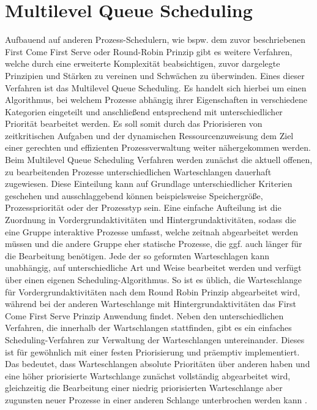 
\section{Multilevel Queue Scheduling}
Aufbauend auf anderen Prozess-Schedulern, wie bspw. dem zuvor beschriebenen First Come First Serve oder Round-Robin Prinzip gibt es weitere Verfahren, welche durch eine erweiterte Komplexität beabsichtigen, zuvor dargelegte Prinzipien und Stärken zu vereinen und Schwächen zu überwinden. Eines dieser Verfahren ist das Multilevel Queue Scheduling. Es handelt sich hierbei um einen Algorithmus, bei welchem Prozesse abhängig ihrer Eigenschaften in verschiedene Kategorien eingeteilt und anschließend entsprechend mit unterschiedlicher Priorität bearbeitet werden. Es soll somit durch das Priorisieren von zeitkritischen Aufgaben und der dynamischen Ressourcenzuweisung dem Ziel einer gerechten und effizienten Prozessverwaltung weiter nähergekommen werden.
Beim Multilevel Queue Scheduling Verfahren werden zunächst die aktuell offenen, zu bearbeitenden Prozesse unterschiedlichen Warteschlangen dauerhaft zugewiesen. Diese Einteilung kann auf Grundlage unterschiedlicher Kriterien geschehen und ausschlaggebend können beispielsweise Speichergröße, Prozesspriorität oder der Prozesstyp sein. Eine einfache Aufteilung ist die Zuordnung in Vordergrundaktivitäten und Hintergrundaktivitäten, sodass die eine Gruppe interaktive Prozesse umfasst, welche zeitnah abgearbeitet werden müssen und die andere Gruppe eher statische Prozesse, die ggf. auch länger für die Bearbeitung benötigen. Jede der so geformten Warteschlagen kann unabhängig, auf unterschiedliche Art und Weise bearbeitet werden und verfügt über einen eigenen Scheduling-Algorithmus. So ist es üblich, die Warteschlange für Vordergrundaktivitäten nach dem Round Robin Prinzip abgearbeitet wird, während bei der anderen Warteschlange mit Hintergrundaktivitäten das First Come First Serve Prinzip Anwendung findet. %
Neben den unterschiedlichen Verfahren, die innerhalb der Wartschlangen stattfinden, gibt es ein einfaches Scheduling-Verfahren zur Verwaltung der Warteschlangen untereinander. Dieses ist für gewöhnlich mit einer festen Priorisierung und präemptiv implementiert. Das bedeutet, dass Warteschlangen absolute Prioritäten über anderen haben und eine höher priorisierte Wartschlange zunächst vollständig abgearbeitet wird, gleichzeitig die Bearbeitung einer niedrig priorisierten Warteschlange aber zugunsten neuer Prozesse in einer anderen Schlange unterbrochen werden kann \cite[S.214 f.]{Silberschatz.2019}.

